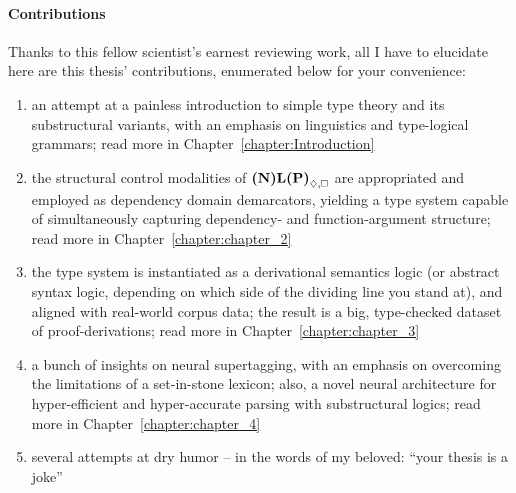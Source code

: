 \paragraph{Contributions}
Thanks to this fellow scientist's earnest reviewing work, all I have to elucidate here are this thesis' contributions, enumerated below for your convenience:
\begin{enumerate}
\item an attempt at a painless introduction to simple type theory and its substructural variants, with an emphasis on linguistics and type-logical grammars; read more in Chapter~\ref{chapter:Introduction}
\item the structural control modalities of $\logic{(N)L(P)}_{\diamond, \bx}$ are appropriated and employed as dependency domain demarcators, yielding a type system capable of simultaneously capturing dependency- and function-argument structure; read more in Chapter~\ref{chapter:chapter_2}
\item the type system is instantiated as a derivational semantics logic (or abstract syntax logic, depending on which side of the dividing line you stand at), and aligned with real-world corpus data; the result is a big, type-checked dataset of proof-derivations; read more in Chapter~\ref{chapter:chapter_3}
\item a bunch of insights on neural supertagging, with an emphasis on overcoming the limitations of a set-in-stone lexicon; also, a novel neural architecture for hyper-efficient and hyper-accurate parsing with substructural logics; read more in Chapter~\ref{chapter:chapter_4}
\item several attempts at dry humor -- in the words of my beloved: ``your thesis is a joke''
\end{enumerate}